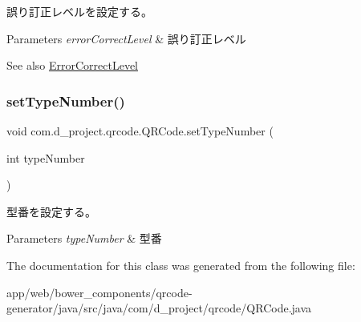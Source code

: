 誤り訂正レベルを設定する。 
\begin{DoxyParams}{Parameters}
{\em error\+Correct\+Level} & 誤り訂正レベル \\
\hline
\end{DoxyParams}
\begin{DoxySeeAlso}{See also}
\hyperlink{interfacecom_1_1d__project_1_1qrcode_1_1_error_correct_level}{Error\+Correct\+Level} 
\end{DoxySeeAlso}
\mbox{\label{classcom_1_1d__project_1_1qrcode_1_1_q_r_code_aa782d70c42402337b427e832693dce85}} 
\subsubsection{\texorpdfstring{set\+Type\+Number()}{setTypeNumber()}}
{\footnotesize\ttfamily void com.\+d\+\_\+project.\+qrcode.\+Q\+R\+Code.\+set\+Type\+Number (\begin{DoxyParamCaption}\item[{int}]{type\+Number }\end{DoxyParamCaption})\hspace{0.3cm}{\ttfamily [inline]}}

型番を設定する。 
\begin{DoxyParams}{Parameters}
{\em type\+Number} & 型番 \\
\hline
\end{DoxyParams}


The documentation for this class was generated from the following file\+:\begin{DoxyCompactItemize}
\item 
app/web/bower\+\_\+components/qrcode-\/generator/java/src/java/com/d\+\_\+project/qrcode/Q\+R\+Code.\+java\end{DoxyCompactItemize}
